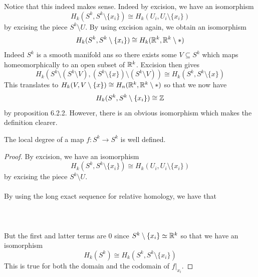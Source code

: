 \documentclass[a4paper]{article}
\begin{document}
Notice that this indeed makes sense. Indeed by excision, we have an isomorphism $$H_k(S^k,S^k\setminus\{x_i\})\cong H_k(U_i,U_i\setminus\{x_i\})$$ by excising the piece $S^k\setminus U$. By using excision again, we obtain an isomorphism $$H_k(S^k,S^k\setminus\{x_i\})\cong H_k(\mathbb{R}^k,\mathbb{R}^k\setminus\ast)$$ Indeed $S^k$ is a smooth manifold ans so there exists some $V\subseteq S^k$ which maps homeomorphically to an open subset of $\mathbb{R}^k$. Excision then gives $$H_k\left(S^k\setminus(S^k\setminus V),(S^k\setminus\{x\})\setminus(S^k\setminus V)\right)\cong H_k(S^k,S^k\setminus\{x\})$$ This translates to $H_k(V,V\setminus\{x\})\cong H_n(\mathbb{R}^k,\mathbb{R}^k\setminus\ast)$ so that we now have $$H_k(S^k,S^k\setminus\{x_i\})\cong\mathbb{Z}$$ by proposition 6.2.2. However, there is an obvious isomorphism which makes the definition clearer. 

\begin{lmm}{}{} The local degree of a map $f:S^k\to S^k$ is well defined. \tcbline
\begin{proof}
By excision, we have an isomorphism $$H_k(S^k,S^k\setminus\{x_i\})\cong H_k(U_i,U_i\setminus\{x_i\})$$ by excising the piece $S^k\setminus U$. \\~\\

By using the long exact sequence for relative homology, we have that \\~\\
\\~\\
But the first and latter terms are $0$ since $S^k\setminus\{x_i\}\simeq\mathbb{R}^k$ so that we have an isomorphism $$H_k(S^k)\cong H_k(S^k,S^k\setminus\{x_i\})$$ This is true for both the domain and the codomain of $f|_{x_i}$. 
\end{proof}
\end{lmm}
\end{document}
